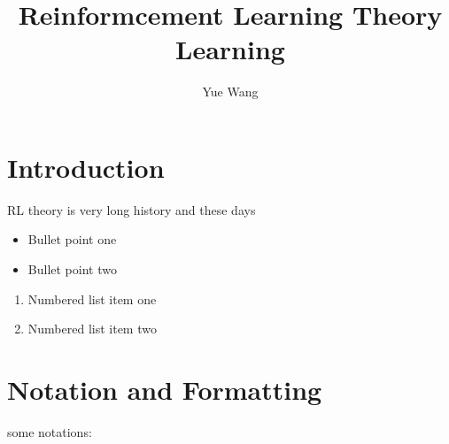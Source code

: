 \documentclass[10pt,a4paper]{article}
\title{Reinformcement Learning Theory Learning}
\author{Yue Wang}
\theoremstyle{definition}
\theoremstyle{remark}
\begin{document}
	\maketitle
	
	
	\section{Introduction}
	\label{introduction}
	
	RL theory is very long history and these days
	
	\begin{itemize}
		\item Bullet point one
		\item Bullet point two
	\end{itemize}
	
	\begin{enumerate}
		\item Numbered list item one
		\item Numbered list item two
	\end{enumerate}
	
	\section{Notation and Formatting}
	\label{notation}
	some notations: 
	
\end{document}
